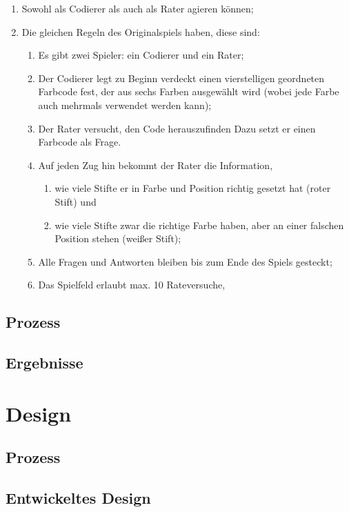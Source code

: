 \documentclass[10pt]{article}
\begin{document}
\begin{enumerate}
\item Sowohl als Codierer als auch als Rater agieren können;
\item Die gleichen Regeln des Originalspiels haben, diese sind:
\begin{enumerate}
\item Es gibt zwei Spieler: ein Codierer und ein Rater;
\item Der Codierer legt zu Beginn verdeckt einen vierstelligen geordneten Farbcode fest, der aus sechs Farben ausgewählt wird (wobei jede Farbe auch mehrmals verwendet werden kann);
\item Der Rater versucht, den Code herauszufinden
Dazu setzt er einen Farbcode als Frage.
\item Auf jeden Zug hin bekommt der Rater die Information,
\begin{enumerate}
\item wie viele Stifte er in Farbe und Position richtig gesetzt hat (roter Stift) und
\item wie viele Stifte zwar die richtige Farbe haben, aber an einer falschen Position stehen (weißer Stift); 
\end{enumerate}
\item Alle Fragen und Antworten bleiben bis zum Ende des Spiels gesteckt;
\item Das Spielfeld erlaubt max. 10 Rateversuche,
\end{enumerate}
\end{enumerate}


\subsection{Prozess}
\subsection{Ergebnisse}

\section{Design}
\subsection{Prozess}
\subsection{Entwickeltes Design}
\end{document}
